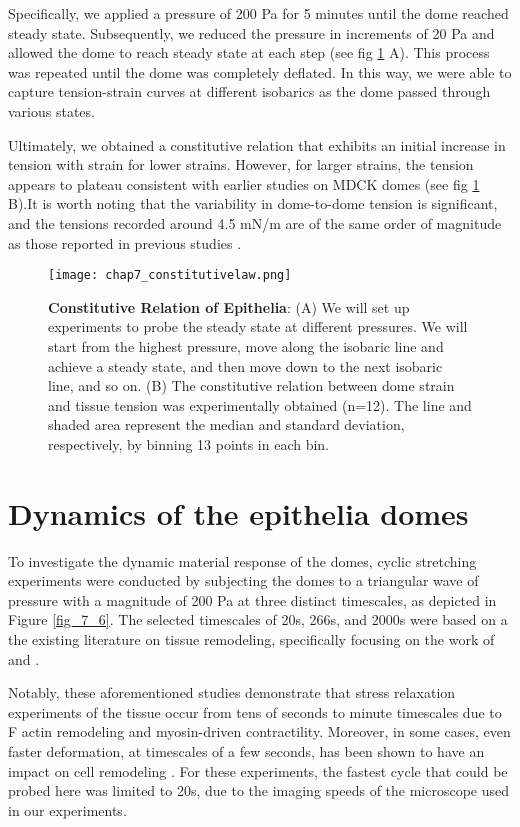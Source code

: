 Specifically, we applied a pressure of 200 Pa for 5 minutes until the dome reached steady state. Subsequently, we reduced the pressure in increments of 20 Pa and allowed the dome to reach steady state at each step (see fig \ref{fig_7_5} A). This process was repeated until the dome was completely deflated. In this way, we were able to capture tension-strain curves at different isobarics as the dome passed through various states.

Ultimately, we obtained a constitutive relation that exhibits an initial increase in tension with strain for lower strains. However, for larger strains, the tension appears to plateau consistent with earlier studies on MDCK domes (see fig \ref{fig_7_5} B).It is worth noting that the variability in dome-to-dome tension is significant, and the tensions recorded around 4.5 \unit{mN/m} are of the same order of magnitude as those reported in previous studies \cite{latorre2018, marin-llaurado2022}.

\begin{figure}
	\centering
	\texttt{[image: chap7\_constitutivelaw.png]}
	\caption{\label{fig_7_5} \textbf{Constitutive Relation of Epithelia}: (A) We will set up experiments to probe the steady state at different pressures. We will start from the highest pressure, move along the isobaric line and achieve a steady state, and then move down to the next isobaric line, and so on.	(B) The constitutive relation between dome strain and tissue tension was experimentally obtained (n=12). The line and shaded area represent the median and standard deviation, respectively, by binning 13 points in each bin.
	}
\end{figure}


\hypertarget{dynamics-of-the-epithelia-domes}{%
	\section{Dynamics of the epithelia
		domes}\label{dynamics-of-the-epithelia-domes}}
	

To investigate the dynamic material response of the domes, cyclic stretching experiments were conducted by subjecting the domes to a triangular wave of pressure with a magnitude of 200 Pa at three distinct timescales, as depicted in Figure \ref{fig_7_6}. The selected timescales of 20s, 266s, and 2000s were based on a the existing literature on tissue remodeling, specifically focusing on the work of \cite{khalilgharibi2019} and \cite{casares2015}.

Notably, these aforementioned studies demonstrate that stress relaxation experiments of the tissue occur from tens of seconds to minute timescales due to F actin remodeling and myosin-driven contractility. Moreover, in some cases, even faster deformation, at timescales of a few seconds, has been shown to have an impact on cell remodeling \cite{andreu2021a}. For these experiments, the fastest cycle that could be probed here was limited to 20s, due to the imaging speeds of the microscope used in our experiments.

